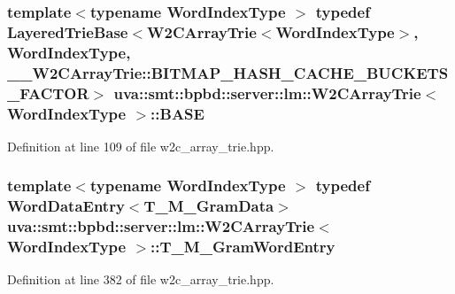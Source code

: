 \subsubsection[{B\+A\+S\+E}]{\setlength{\rightskip}{0pt plus 5cm}template$<$typename Word\+Index\+Type $>$ typedef {\bf Layered\+Trie\+Base}$<${\bf W2\+C\+Array\+Trie}$<${\bf Word\+Index\+Type}$>$, {\bf Word\+Index\+Type}, \+\_\+\+\_\+\+W2\+C\+Array\+Trie\+::\+B\+I\+T\+M\+A\+P\+\_\+\+H\+A\+S\+H\+\_\+\+C\+A\+C\+H\+E\+\_\+\+B\+U\+C\+K\+E\+T\+S\+\_\+\+F\+A\+C\+T\+O\+R$>$ {\bf uva\+::smt\+::bpbd\+::server\+::lm\+::\+W2\+C\+Array\+Trie}$<$ {\bf Word\+Index\+Type} $>$\+::{\bf B\+A\+S\+E}}\label{classuva_1_1smt_1_1bpbd_1_1server_1_1lm_1_1_w2_c_array_trie_ad13c0f47859d030152254340a71d26b8}


Definition at line 109 of file w2c\+\_\+array\+\_\+trie.\+hpp.

\hypertarget{classuva_1_1smt_1_1bpbd_1_1server_1_1lm_1_1_w2_c_array_trie_ae7c0abfe284068abf738511b29dfc727}{}
\subsubsection[{T\+\_\+\+M\+\_\+\+Gram\+Word\+Entry}]{\setlength{\rightskip}{0pt plus 5cm}template$<$typename Word\+Index\+Type $>$ typedef {\bf Word\+Data\+Entry}$<${\bf T\+\_\+\+M\+\_\+\+Gram\+Data}$>$ {\bf uva\+::smt\+::bpbd\+::server\+::lm\+::\+W2\+C\+Array\+Trie}$<$ {\bf Word\+Index\+Type} $>$\+::{\bf T\+\_\+\+M\+\_\+\+Gram\+Word\+Entry}\hspace{0.3cm}{\ttfamily [protected]}}\label{classuva_1_1smt_1_1bpbd_1_1server_1_1lm_1_1_w2_c_array_trie_ae7c0abfe284068abf738511b29dfc727}


Definition at line 382 of file w2c\+\_\+array\+\_\+trie.\+hpp.

\hypertarget{classuva_1_1smt_1_1bpbd_1_1server_1_1lm_1_1_w2_c_array_trie_a906d0b9e5c49f66de0788d5c9a7324f7}{}

